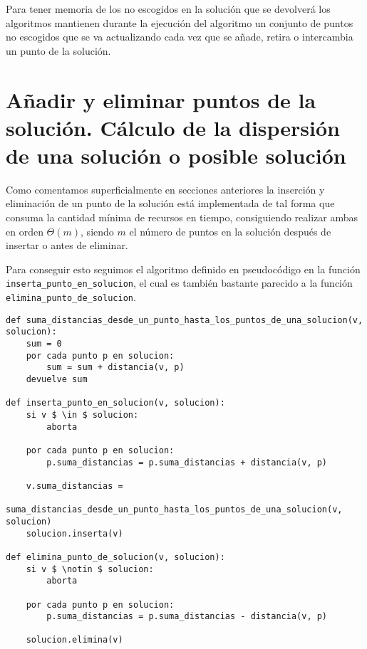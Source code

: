 Para tener memoria de los no escogidos en la solución que se devolverá los algoritmos mantienen durante la ejecución del algoritmo un
conjunto de puntos no escogidos que se va actualizando cada vez que se añade, retira o intercambia un punto de la solución.

\section{Añadir y eliminar puntos de la solución. Cálculo de la dispersión de una solución o posible solución}

Como comentamos superficialmente en secciones anteriores la inserción y eliminación de un punto de la solución está implementada de tal
forma que consuma la cantidad mínima de recursos en tiempo, consiguiendo realizar ambas en orden $ \Theta(m) $, siendo $ m $ el 
número de puntos en la solución después de insertar o antes de eliminar.

Para conseguir esto seguimos el algoritmo definido en pseudocódigo en la función \texttt{inserta\_punto\_en\_solucion}, el cual es también bastante parecido
a la función \texttt{elimina\_punto\_de\_solucion}.

\begin{minipage}{\textwidth}
\begin{lstlisting}[mathescape=true,caption={Definición en pseudocódigo de las funciones que permiten añadir y eliminar puntos a una solución.},captionpos=b]
def suma_distancias_desde_un_punto_hasta_los_puntos_de_una_solucion(v, solucion):
    sum = 0
    por cada punto p en solucion:
        sum = sum + distancia(v, p)
    devuelve sum

def inserta_punto_en_solucion(v, solucion):
    si v $ \in $ solucion:
        aborta

    por cada punto p en solucion:
        p.suma_distancias = p.suma_distancias + distancia(v, p)
    
    v.suma_distancias =
        suma_distancias_desde_un_punto_hasta_los_puntos_de_una_solucion(v, solucion)
    solucion.inserta(v)

def elimina_punto_de_solucion(v, solucion):
    si v $ \notin $ solucion:
        aborta
    
    por cada punto p en solucion:
        p.suma_distancias = p.suma_distancias - distancia(v, p)
    
    solucion.elimina(v)
\end{lstlisting}
\end{minipage}

